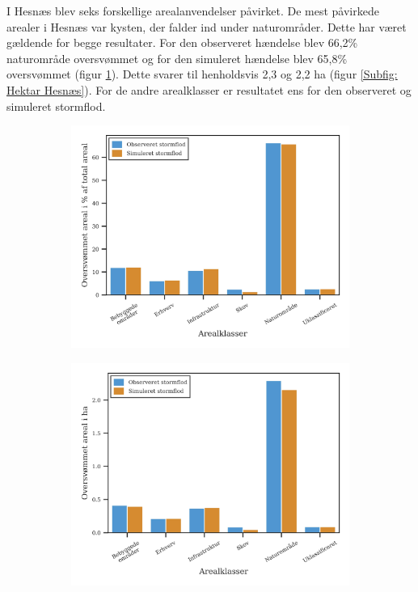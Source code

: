 I Hesnæs blev seks forskellige arealanvendelser påvirket. De mest påvirkede arealer i Hesnæs var kysten, der falder ind under naturområder. Dette har været gældende for begge resultater. For den observeret hændelse blev 66,2\% naturområde oversvømmet og for den simuleret hændelse blev 65,8\% oversvømmet (figur \ref{Subfig: Procent hesnæs}). Dette svarer til henholdsvis 2,3 og 2,2 ha (figur \ref{Subfig: Hektar Hesnæs}). For de andre arealklasser er resultatet ens for den observeret og simuleret stormflod. 
\begin{figure}[H]
    \begin{subfigure}[b]{0.5\textwidth}
        \centering
        \includegraphics[width=1\linewidth]{images/Resultater/areal_anvendelses_grafer/hesnaes_arealanvendelse.jpg}
        \caption{}
        \label{Subfig: Procent hesnæs}
    \end{subfigure}
    \begin{subfigure}[b]{0.5\textwidth}
        \centering
        \includegraphics[width=1\linewidth]{images/Resultater/areal_anvendelses_grafer/hesnaes_oversvommet_Hektar.jpg}

\end{subfigure}
\end{figure}
